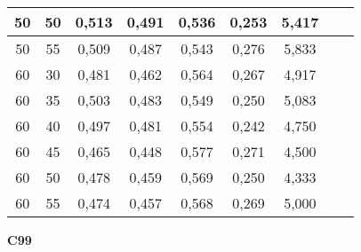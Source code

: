\documentclass{article}
\begin{document}
\begin{longtable}[c]{|c|c|c|c|c|c|c|c|c|}
 50 & 50 & 0,513 & 0,491 & 0,536 & 0,253 & 5,417  \\ \hline 
 50 & 55 & 0,509 & 0,487 & 0,543 & 0,276 & 5,833  \\ \hline 
 60 & 30 & 0,481 & 0,462 & 0,564 & 0,267 & 4,917  \\ \hline 
 60 & 35 & 0,503 & 0,483 & 0,549 & 0,250 & 5,083  \\ \hline 
 60 & 40 & 0,497 & 0,481 & 0,554 & 0,242 & 4,750  \\ \hline 
 60 & 45 & 0,465 & 0,448 & 0,577 & 0,271 & 4,500  \\ \hline 
 60 & 50 & 0,478 & 0,459 & 0,569 & 0,250 & 4,333  \\ \hline 
 60 & 55 & 0,474 & 0,457 & 0,568 & 0,269 & 5,000  \\ \hline 
 \end{longtable} 



 \newpage
{  
\large
\center
	\textbf{C99}  

}
\end{document}
